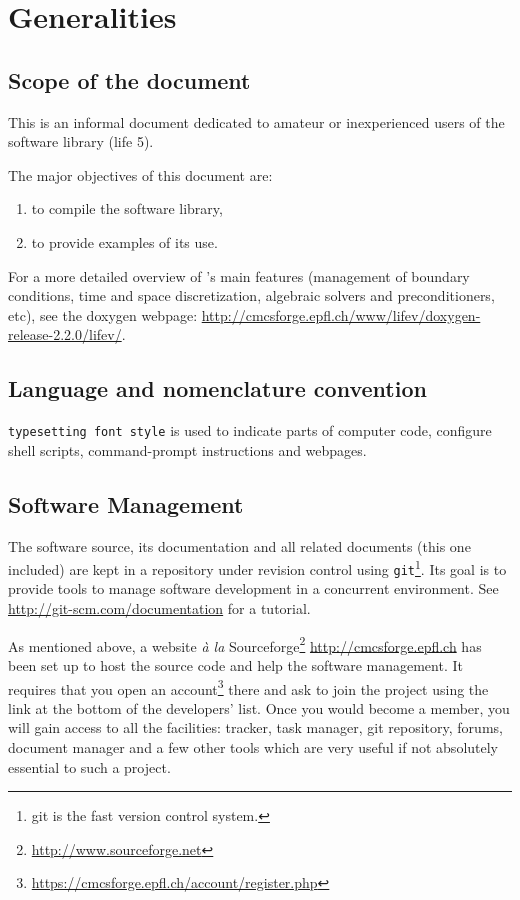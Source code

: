
\chapter{Generalities}
\label{cha:generalities}

\section{Scope of the document}
\label{sec:scope-document}

This is an informal document dedicated to amateur or inexperienced users of the 
software library \thelibrary (life 5). 

The major objectives of this document are:
\begin{enumerate}
\item to compile the software library,
\item to provide examples of its use.
\end{enumerate}
For a more detailed overview of \lifev's main features (management of boundary conditions, time and space discretization, algebraic solvers and preconditioners, etc), see the doxygen webpage: \url{http://cmcsforge.epfl.ch/www/lifev/doxygen-release-2.2.0/lifev/}.
\section{Language and nomenclature convention}
\label{sec:lang-nomencl-conv}

\texttt{typesetting font style} is used to indicate parts of
computer code, configure shell scripts, command-prompt instructions and webpages.

\section{Software Management}
\label{sec:software-management}

The software source, its documentation and all related documents (this
one included) are kept in a repository under revision control
using \verb!git!\footnote{git is the fast version control system.}. Its goal
is to provide tools to manage software development in a concurrent environment.
See \url{http://git-scm.com/documentation}
for a tutorial.

As mentioned above, a website {\it\`a la} Sourceforge\footnote{\url{http://www.sourceforge.net}} 
\url{http://cmcsforge.epfl.ch} has been set up 
to host the source code and help the software management.
It requires that you open an account\footnote{\url{https://cmcsforge.epfl.ch/account/register.php}} 
there and ask to join the project \lifev using the link at the 
bottom of the developers' list.
Once you would become a member, you will gain access to all the facilities: 
tracker, task manager, git repository, forums, document manager and a few other 
tools which are very useful if not absolutely essential to such a project.

